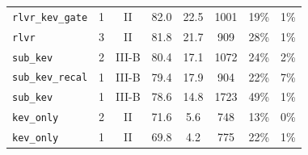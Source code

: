 \begin{tabular}{@{}lccccccc@{}}
\quad \texttt{rlvr\_kev\_gate} & 1 & II & 82.0 & 22.5 & 1001 & 19\% & 1\% \\
\quad \texttt{rlvr} & 3 & II & 81.8 & 21.7 & 909 & 28\% & 1\% \\
\quad \texttt{sub\_kev} & 2 & III-B & 80.4 & 17.1 & 1072 & 24\% & 2\% \\
\quad \texttt{sub\_kev\_recal} & 1 & III-B & 79.4 & 17.9 & 904 & 22\% & 7\% \\
\quad \texttt{sub\_kev} & 1 & III-B & 78.6 & 14.8 & 1723 & 49\% & 1\% \\
\quad \texttt{kev\_only} & 2 & II & 71.6 & 5.6 & 748 & 13\% & 0\% \\
\quad \texttt{kev\_only} & 1 & II & 69.8 & 4.2 & 775 & 22\% & 1\% \\
\bottomrule
\end{tabular}
